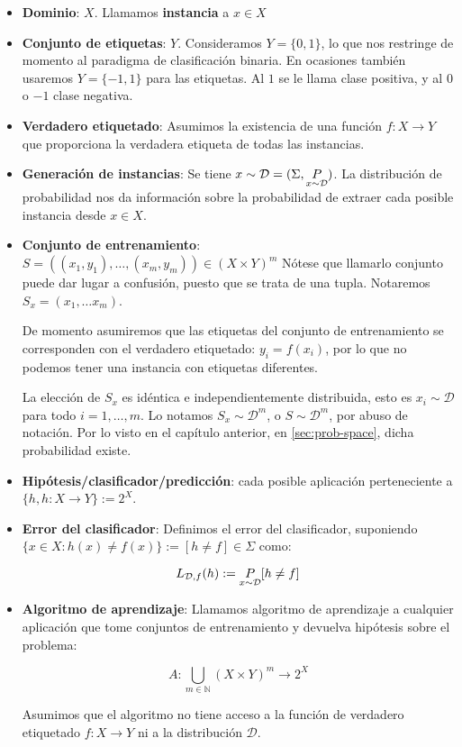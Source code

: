 \begin{itemize}
\item \textbf{Dominio}: $X$. Llamamos \textbf{instancia} a $x\in X$

\item \textbf{Conjunto de etiquetas}: $Y$. Consideramos $Y = \{0,1\}$, lo que nos restringe de momento al paradigma de clasificación binaria. 
En ocasiones también usaremos $Y = \{-1,1\}$ para las etiquetas. Al $1$ se le llama clase positiva, y al $0$ o $-1$ clase negativa.

\item \textbf{Verdadero etiquetado}: \sloppy Asumimos la existencia de una función ${f: X \rightarrow Y}$ 
que proporciona la verdadera etiqueta de todas las instancias.

\item \textbf{Generación de instancias}: \fussy Se tiene $x\sim \mathcal{D} = (\Sigma, \underset{x\sim \mathcal{D}}{P})$. La distribución de probabilidad nos da 
información sobre la probabilidad de extraer cada posible instancia desde  $x \in X$. 

\item \textbf{Conjunto de entrenamiento}: $S = ((x_1,y_1), \ldots, (x_m,y_m)) \in (X \times Y)^m$ 
Nótese que llamarlo conjunto puede dar lugar a confusión, puesto que se trata de una tupla. Notaremos 
$S_x = (x_1, \ldots x_m)$.

De momento asumiremos que las etiquetas del conjunto de entrenamiento se corresponden con el verdadero etiquetado: 
$y_i = f(x_i)$, por lo que no podemos tener una instancia con etiquetas diferentes.

La elección de $S_x$ es idéntica e independientemente distribuida, esto es $x_i \sim \mathcal{D}$ para todo $i=1, \ldots, m$.
Lo notamos $S_x \sim \mathcal{D}^m$, o $S \sim \mathcal{D}^m$, por abuso de notación. Por lo visto en el capítulo
anterior, en \ref{sec:prob-space}, dicha probabilidad existe.

\item \textbf{Hipótesis/clasificador/predicción}: cada posible aplicación perteneciente a 
$\{h, h:X \rightarrow Y\} := 2^{X}$. 

\item \textbf{Error del clasificador}: Definimos el error del clasificador, suponiendo 
$\{x\in X : h(x) \neq f(x)\} := [h\neq f] \in \Sigma$ como:

\[L_{\mathcal{D},f}(h) :=  \underset{x\sim \mathcal{D}}{P} [h \neq f]\]

\item \textbf{Algoritmo de aprendizaje}: Llamamos algoritmo de aprendizaje a cualquier aplicación que tome conjuntos de 
entrenamiento y devuelva hipótesis sobre el problema:

\[A: \underset{m\in \mathbb{N}}{\bigcup} (X\times Y)^m \rightarrow 2^{X}\]

Asumimos que el algoritmo no tiene acceso a la función de verdadero etiquetado $f: X \rightarrow Y$ ni a
la distribución $\mathcal{D}$.
\end{itemize}

